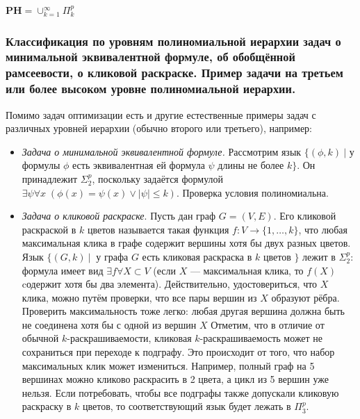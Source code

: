 \begin{corollary}
    $\mathbf{PH} = \cup_{k=1}^{\infty}\Pi_{k}^p$
\end{corollary}

\subsubsection{Классификация по уровням полиномиальной иерархии задач о минимальной эквивалентной формуле, об обобщённой рамсеевости, о кликовой раскраске. Пример задачи на третьем или более высоком уровне полиномиальной иерархии.}
Помимо задач оптимизации есть и другие естественные примеры задач с
различных уровней иерархии (обычно второго или третьего), например:

\begin{itemize}

    \item \textit{Задача о минимальной эквивалентной формуле.} Рассмотрим язык  $\{ (\phi, k) \ | $ у формулы $\phi$ есть эквивалентная ей формула $\psi$ длины не более $k \}$. Он принадлежит $\Sigma_2^p$, поскольку задаётся формулой $\exists \psi \forall x \; (\phi(x) = \psi(x) \vee |\psi| \leq k )$. Проверка условия полиномиальна.
    
    \item \textit{Задача о кликовой раскраске}. Пусть дан граф $G = (V, E)$. Его кликовой раскраской в $k$ цветов называется такая функция $f : V \to \{ 1, \ldots, k \}$, что любая максимальная клика в графе содержит вершины хотя бы двух разных цветов. Язык $\{ (G, k) \ | \ $ у графа $G$ есть кликовая раскраска в $k$ цветов $\}$ лежит в $\Sigma_{2}^p$: формула имеет вид $\exists f \forall X \subset V$ (если $X$ — максимальная клика, то $f(X)$ cодержит хотя бы два элемента). Действительно, удостовериться, что $X$ клика, можно путём проверки, что все пары вершин из $X$ образуют рёбра. Проверить максимальность тоже легко: любая другая вершина должна быть не соединена хотя бы с одной из вершин $X$ Отметим, что в отличие от обычной $k$-раскрашиваемости, кликовая $k$-раскрашиваемость может не сохраниться при переходе к подграфу. Это происходит от того, что набор максимальных клик может измениться. Например, полный граф на 5 вершинах можно кликово раскрасить в 2 цвета, а цикл из 5 вершин уже нельзя. Если потребовать, чтобы все подграфы также допускали кликовую раскраску в $k$ цветов, то соответствующий язык будет лежать в $\Pi_{3}^p$. 


\end{itemize}
